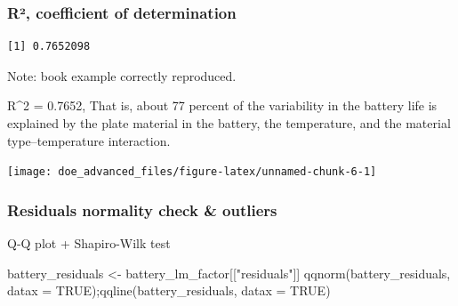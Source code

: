 \documentclass[
]{book}
\newenvironment{Shaded}{\begin{snugshade}}{\end{snugshade}}
\newcommand{\AttributeTok}[1]{\textcolor[rgb]{0.77,0.63,0.00}{#1}}
\newcommand{\ConstantTok}[1]{\textcolor[rgb]{0.00,0.00,0.00}{#1}}
\newcommand{\FunctionTok}[1]{\textcolor[rgb]{0.00,0.00,0.00}{#1}}
\newcommand{\NormalTok}[1]{#1}
\newcommand{\OtherTok}[1]{\textcolor[rgb]{0.56,0.35,0.01}{#1}}
\newcommand{\SpecialCharTok}[1]{\textcolor[rgb]{0.00,0.00,0.00}{#1}}
\newcommand{\StringTok}[1]{\textcolor[rgb]{0.31,0.60,0.02}{#1}}
\begin{document}
\hypertarget{ruxb2-coefficient-of-determination}{%
\subsubsection{R², coefficient of determination}\label{ruxb2-coefficient-of-determination}}

\begin{Shaded}
\end{Shaded}

\begin{verbatim}
[1] 0.7652098
\end{verbatim}

Note: book example correctly reproduced.

R\^{}2 = 0.7652, That is, about 77 percent of the variability in the battery life is explained by the plate material in the battery, the temperature, and the material type--temperature interaction.

\begin{Shaded}
\end{Shaded}

\texttt{[image: doe\_advanced\_files/figure-latex/unnamed-chunk-6-1]}

\hypertarget{residuals-normality-check-outliers}{%
\subsubsection{Residuals normality check \& outliers}\label{residuals-normality-check-outliers}}

Q-Q plot + Shapiro-Wilk test

\begin{Shaded}
\begin{Highlighting}[]
\NormalTok{battery\_residuals }\OtherTok{\textless{}{-}}\NormalTok{ battery\_lm\_factor[[}\StringTok{"residuals"}\NormalTok{]]}
\FunctionTok{qqnorm}\NormalTok{(battery\_residuals, }\AttributeTok{datax =} \ConstantTok{TRUE}\NormalTok{);}\FunctionTok{qqline}\NormalTok{(battery\_residuals, }\AttributeTok{datax =} \ConstantTok{TRUE}\NormalTok{)}
\end{Highlighting}
\end{Shaded}
\end{document}
